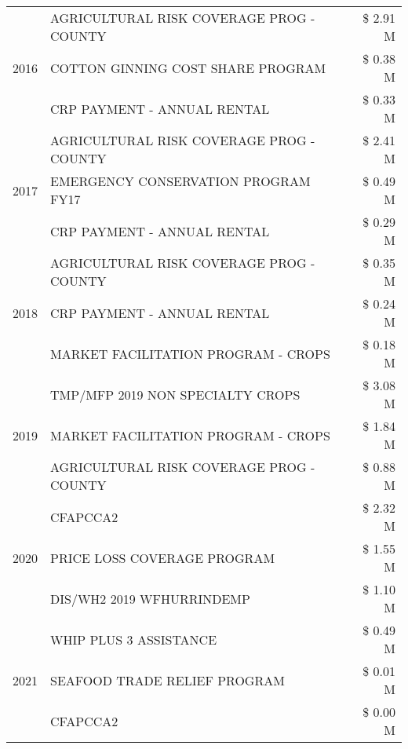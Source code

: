 \begin{tabular}{llr}
\multirow[t]{3}{*}{2016} & AGRICULTURAL RISK COVERAGE PROG - COUNTY & \$ 2.91 M \\
 & COTTON GINNING COST SHARE PROGRAM & \$ 0.38 M \\
 & CRP PAYMENT - ANNUAL RENTAL & \$ 0.33 M \\
\cline{1-3}
\multirow[t]{3}{*}{2017} & AGRICULTURAL RISK COVERAGE PROG - COUNTY & \$ 2.41 M \\
 & EMERGENCY CONSERVATION PROGRAM FY17 & \$ 0.49 M \\
 & CRP PAYMENT - ANNUAL RENTAL & \$ 0.29 M \\
\cline{1-3}
\multirow[t]{3}{*}{2018} & AGRICULTURAL RISK COVERAGE PROG - COUNTY & \$ 0.35 M \\
 & CRP PAYMENT - ANNUAL RENTAL & \$ 0.24 M \\
 & MARKET FACILITATION PROGRAM - CROPS & \$ 0.18 M \\
\cline{1-3}
\multirow[t]{3}{*}{2019} & TMP/MFP 2019 NON SPECIALTY CROPS & \$ 3.08 M \\
 & MARKET FACILITATION PROGRAM - CROPS & \$ 1.84 M \\
 & AGRICULTURAL RISK COVERAGE PROG - COUNTY & \$ 0.88 M \\
\cline{1-3}
\multirow[t]{3}{*}{2020} & CFAPCCA2 & \$ 2.32 M \\
 & PRICE LOSS COVERAGE PROGRAM & \$ 1.55 M \\
 & DIS/WH2 2019 WFHURRINDEMP & \$ 1.10 M \\
\cline{1-3}
\multirow[t]{3}{*}{2021} & WHIP PLUS 3 ASSISTANCE & \$ 0.49 M \\
 & SEAFOOD TRADE RELIEF PROGRAM & \$ 0.01 M \\
 & CFAPCCA2 & \$ 0.00 M \\
\cline{1-3}
\bottomrule
\end{tabular}

